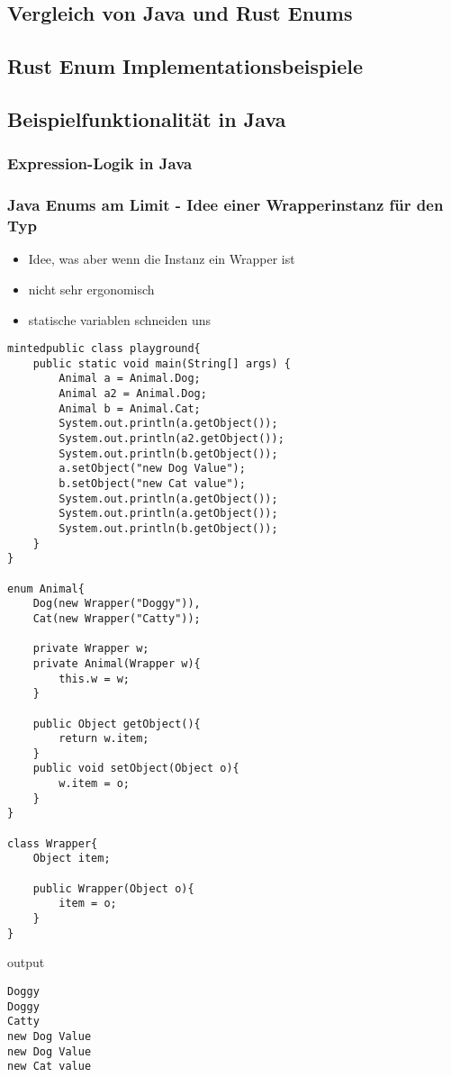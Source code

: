 \documentclass[a4paper, 1ppt]{article}
\begin{document}
\subsection{Vergleich von Java und Rust Enums}
\subsection{Rust Enum Implementationsbeispiele}
\subsection{Beispielfunktionalität in Java}
\subsubsection{Expression-Logik in Java}
\subsubsection{Java Enums am Limit - Idee einer Wrapperinstanz für den Typ}
\begin{itemize}
	\item Idee, was aber wenn die Instanz ein Wrapper ist
	\item nicht sehr ergonomisch 
	\item statische variablen schneiden uns 
\end{itemize}
\begin{verbatim}
mintedpublic class playground{
	public static void main(String[] args) {
		Animal a = Animal.Dog;
		Animal a2 = Animal.Dog;
		Animal b = Animal.Cat;
		System.out.println(a.getObject());
		System.out.println(a2.getObject());
		System.out.println(b.getObject());
		a.setObject("new Dog Value");
		b.setObject("new Cat value");
		System.out.println(a.getObject());
		System.out.println(a.getObject());
		System.out.println(b.getObject());
	}
}

enum Animal{
	Dog(new Wrapper("Doggy")),
	Cat(new Wrapper("Catty"));

	private Wrapper w;
	private Animal(Wrapper w){
		this.w = w;
	}

	public Object getObject(){
		return w.item;
	}
	public void setObject(Object o){
		w.item = o;
	}
}

class Wrapper{
	Object item;

	public Wrapper(Object o){
		item = o;
	}
}
\end{verbatim}
output
\begin{verbatim}
Doggy
Doggy
Catty
new Dog Value
new Dog Value
new Cat value
\end{verbatim}
\end{document}
